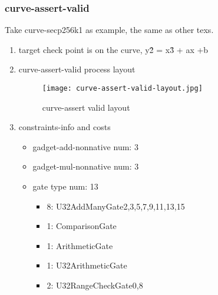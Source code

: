 \subsubsection{curve-assert-valid}
\label{curve-assert-valid}

Take curve-secp256k1 as example, the same as other texs.

\begin{enumerate}
    \item target
        check point is on the curve, y\^2 = x\^3 + ax +b
    \item curve-assert-valid process layout
        \begin{figure}[!ht]
            \centering
            \texttt{[image: curve-assert-valid-layout.jpg]}
            \caption{curve-assert valid layout}
            \label{fig:curve-assert-valid-layout}
        \end{figure}
    \item constraints-info and costs
        \begin{itemize}
            \item gadget-add-nonnative num: 3
            \item gadget-mul-nonnative num: 3
            \item gate type num: 13
                \begin{itemize}
                    \item 8: U32AddManyGate{2,3,5,7,9,11,13,15}
                    \item 1: ComparisonGate
                    \item 1: ArithmeticGate
                    \item 1: U32ArithmeticGate
                    \item 2: U32RangeCheckGate{0,8}
                \end{itemize}
        \end{itemize}

\end{enumerate}